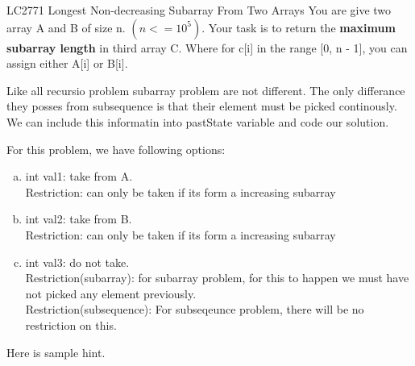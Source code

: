 \begin{problem}{LC2771 Longest Non-decreasing Subarray From Two Arrays}
    You are give two array A and B of size n. $(n <= 10^5)$. Your task is to return the \textbf{maximum subarray length} in third array C. Where for c[i] in the range [0, n - 1], you can assign either A[i] or B[i].

\end{problem}

\begin{solution}

    Like all recursio problem subarray problem are not different.
    The only differance they posses from subsequence is that their element must be picked continously. We can include this informatin into pastState variable and code our solution.

    \medskip

    \medskip

    \medskip
    For this problem, we have following options:
    \begin{enumerate}[(a)]
        \item int val1: take from A. \\Restriction: can only be taken if its form a increasing subarray
        \item int val2: take from B. \\Restriction: can only be taken if its form a increasing subarray
        \item int val3: do not take.\\ 
        Restriction(subarray): for subarray problem, for this to happen we must have not picked any element previously.\\
        Restriction(subsequence):
        For subseqeunce problem, there will be no restriction on this.
    \end{enumerate}
    
    \begin{guide}
        Here is sample hint.

    \end{guide}

    \begin{lstlisting}[caption=Python example]


\end{lstlisting}
\end{solution}
